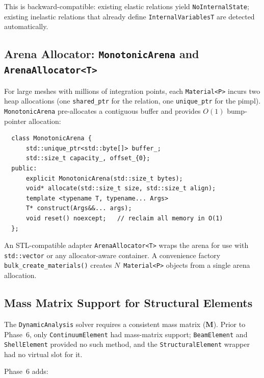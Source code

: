 This is backward-compatible: existing elastic relations yield
\texttt{NoInternalState}; existing inelastic relations that already
define \texttt{InternalVariablesT} are detected automatically.

\subsection{Arena Allocator: \texttt{MonotonicArena} and \texttt{ArenaAllocator<T>}}

For large meshes with millions of integration points, each
\texttt{Material<P>} incurs two heap allocations (one
\texttt{shared\_ptr} for the relation, one \texttt{unique\_ptr} for the
pimpl).  \texttt{MonotonicArena} pre-allocates a contiguous buffer
and provides $O(1)$ bump-pointer allocation:

\begin{verbatim}
  class MonotonicArena {
      std::unique_ptr<std::byte[]> buffer_;
      std::size_t capacity_, offset_{0};
  public:
      explicit MonotonicArena(std::size_t bytes);
      void* allocate(std::size_t size, std::size_t align);
      template <typename T, typename... Args>
      T* construct(Args&&... args);
      void reset() noexcept;   // reclaim all memory in O(1)
  };
\end{verbatim}

An STL-compatible adapter \texttt{ArenaAllocator<T>} wraps the arena
for use with \texttt{std::vector} or any allocator-aware container.
A convenience factory \texttt{bulk\_create\_materials()} creates
$N$~\texttt{Material<P>} objects from a single arena allocation.

\subsection{Mass Matrix Support for Structural Elements}

The \texttt{DynamicAnalysis} solver requires a consistent mass matrix
($\mathbf{M}$).  Prior to Phase~6, only \texttt{ContinuumElement} had
mass-matrix support; \texttt{BeamElement} and \texttt{ShellElement}
provided no such method, and the \texttt{StructuralElement} wrapper
had no virtual slot for it.

Phase~6 adds:

